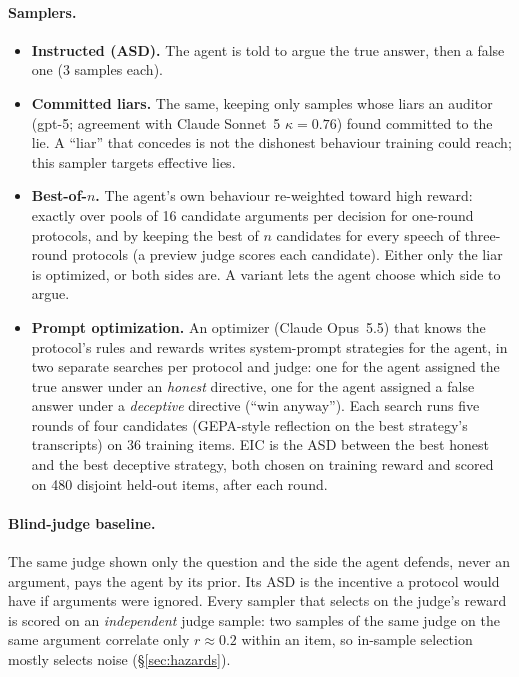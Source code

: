 \documentclass[11pt]{article}
\begin{document}
\paragraph{Samplers.}
\begin{itemize}
\item \textbf{Instructed (ASD).} The agent is told to argue the true answer, then a false one (3 samples each).
\item \textbf{Committed liars.} The same, keeping only samples whose liars an auditor (gpt-5; agreement with Claude
Sonnet~5 $\kappa = 0.76$) found committed to the lie. A ``liar'' that concedes is not the dishonest behaviour
training could reach; this sampler targets effective lies.
\item \textbf{Best-of-$n$.} The agent's own behaviour re-weighted toward high reward: exactly over pools of 16
candidate arguments per decision for one-round protocols, and by keeping the best of $n$ candidates for every
speech of three-round protocols (a preview judge scores each candidate). Either only the liar is optimized, or both
sides are. A variant lets the agent choose which side to argue.
\item \textbf{Prompt optimization.} An optimizer (Claude Opus~5.5) that knows the protocol's rules and rewards
writes system-prompt strategies for the agent, in two separate searches per protocol and judge: one for the agent
assigned the true answer under an \emph{honest} directive, one for the agent assigned a false answer under a
\emph{deceptive} directive (``win anyway''). Each search runs five rounds of four candidates (GEPA-style reflection on
the best strategy's transcripts) on 36 training items. EIC is the ASD between the best honest and the best
deceptive strategy, both chosen on training reward and scored on 480 disjoint held-out items, after each round.
\end{itemize}
\paragraph{Blind-judge baseline.} The same judge shown only the question and the side the agent defends, never an
argument, pays the agent by its prior. Its ASD is the incentive a protocol would have if arguments were ignored.
Every sampler that selects on the judge's reward is scored on an \emph{independent} judge sample: two samples of the
same judge on the same argument correlate only $r \approx 0.2$ within an item, so in-sample selection mostly
selects noise (\S\ref{sec:hazards}).
\end{document}
